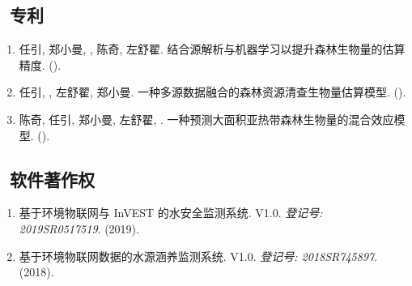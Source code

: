 \subsection*{\texorpdfstring{\faBook\ 专利}{专利}}
\begin{enumerate}
\item
     任引, 郑小曼, {}, 陈奇, 左舒翟.
     结合源解析与机器学习以提升森林生物量的估算精度.
     ({}).
\item
     任引, {}, 左舒翟, 郑小曼.
     一种多源数据融合的森林资源清查生物量估算模型.
     ({}).
\item
     陈奇, 任引, 郑小曼, 左舒翟, {}.
     一种预测大面积亚热带森林生物量的混合效应模型.
     ({}).
\end{enumerate}

\subsection*{\texorpdfstring{\faBook\ 软件著作权}{软件著作权}}
\begin{enumerate}
\item
   基于环境物联网与 InVEST 的水安全监测系统. V1.0.
    \textit{登记号: 2019SR0517519}. (2019).
\item
    基于环境物联网数据的水源涵养监测系统. V1.0.
    \textit{登记号: 2018SR745897}. (2018).
\end{enumerate}

